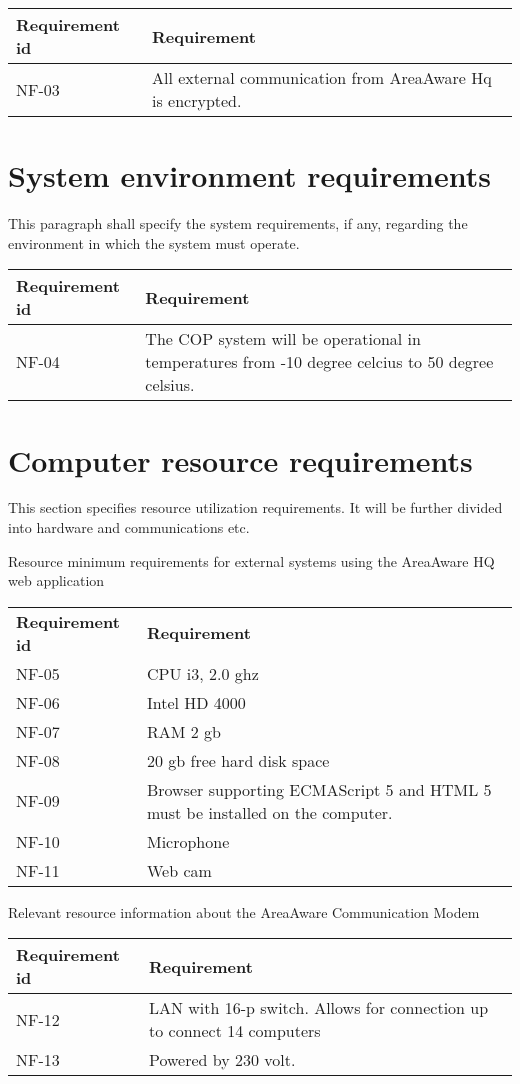 \begin{longtable}{| p{3.2cm} |  p{10cm} | }
	\hline
	\textbf{Requirement id} &  \textbf{Requirement } \\
	\hline
	NF-03 & All external communication from AreaAware Hq is encrypted.  \\
	\hline
\end{longtable}

\label{sec_nonFunc3}
\section{System environment requirements}
This paragraph shall specify the system requirements, if any, regarding the environment in which the system must operate.

\begin{longtable}{| p{3.2cm} |  p{10cm} | }
	\hline
	\textbf{Requirement id} &  \textbf{Requirement } \\
	\hline
	NF-04 & The COP system will be operational in temperatures from -10 degree celcius to 50 degree celsius.  \\
	\hline
\end{longtable}

\label{sec_nonFunc4}
\section{Computer resource requirements}
This section specifies resource utilization requirements. It will be further divided into hardware and communications etc.

Resource minimum requirements for external systems using the AreaAware HQ web application
\begin{longtable}{| p{3.2cm} |  p{10cm} | }
	\hline
	\textbf{Requirement id} &  \textbf{Requirement } \\
	NF-05 & CPU i3, 2.0 ghz \\
	\hline
	NF-06 & Intel HD 4000 \\
	\hline
	NF-07 & RAM 2 gb \\
	\hline
	NF-08 & 20 gb free hard disk space \\
	\hline
	NF-09 & Browser supporting ECMAScript 5 and HTML 5 must be installed on the computer. \\
	\hline
	NF-10 & Microphone \\
	\hline
	NF-11 & Web cam \\
	\hline
\end{longtable}


Relevant resource information about the AreaAware Communication Modem
\begin{longtable}{| p{3.2cm} |  p{10cm} | }
	\hline
	\textbf{Requirement id} &  \textbf{Requirement } \\
	\hline
	NF-12 & LAN with 16-p switch. Allows for connection up to connect 14 computers \\
	\hline
	NF-13 & Powered by 230 volt. \\
	\hline
\end{longtable}


